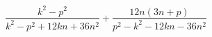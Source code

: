 \begin{ex}[type=expression]
	\begin{condition}
		\(\dfrac{k^2-p^2}{k^2-p^2+12kn+36n^2}+\dfrac{12n(3n+p)}{p^2-k^2-12kn-36n^2}\)
	\end{condition}
\end{ex}